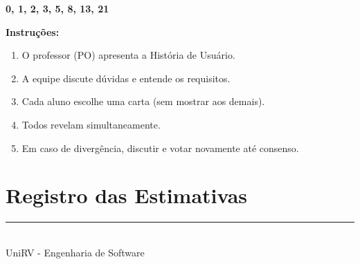 \documentclass[a4paper,12pt]{article}
\begin{document}
\begin{center}
\textbf{0, 1, 2, 3, 5, 8, 13, 21}
\end{center}

\vspace{0.3cm}

\textbf{Instruções:}
\begin{enumerate}
    \item O professor (PO) apresenta a História de Usuário.
    \item A equipe discute dúvidas e entende os requisitos.
    \item Cada aluno escolhe uma carta (sem mostrar aos demais).
    \item Todos revelam simultaneamente.
    \item Em caso de divergência, discutir e votar novamente até consenso.
\end{enumerate}

\vspace{0.5cm}

\section*{Registro das Estimativas}


\vspace{1cm}

\begin{center}
    \rule{0.5\textwidth}{0.4pt} \\
    \small UniRV - Engenharia de Software
\end{center}
\end{document}
